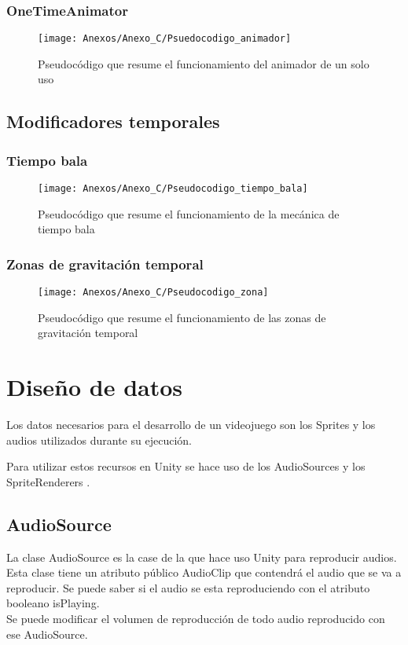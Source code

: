 \subsubsection{OneTimeAnimator}

\begin{figure}[h]
\centering
\texttt{[image: Anexos/Anexo\_C/Psuedocodigo\_animador]}
\caption{Pseudocódigo que resume el funcionamiento del animador de un solo uso}
\end{figure}

\subsection{Modificadores temporales}
\subsubsection{Tiempo bala}

\begin{figure}[h]
\centering
\texttt{[image: Anexos/Anexo\_C/Pseudocodigo\_tiempo\_bala]}
\caption{Pseudocódigo que resume el funcionamiento de la mecánica de tiempo bala}
\end{figure}

\clearpage
\subsubsection{Zonas de gravitación temporal}

\begin{figure}[h]
\centering
\texttt{[image: Anexos/Anexo\_C/Pseudocodigo\_zona]}
\caption{Pseudocódigo que resume el funcionamiento de las zonas de gravitación temporal}
\end{figure}

\section{Diseño de datos}
Los datos necesarios para el desarrollo de un videojuego son los Sprites y los audios utilizados durante su ejecución.

Para utilizar estos recursos en Unity se hace uso de los AudioSources \cite{AudioSource} y los SpriteRenderers \cite{SpriteRenderer}.

\subsection{AudioSource}
La clase AudioSource es la case de la que hace uso Unity para reproducir audios. Esta clase tiene un atributo público AudioClip que contendrá el audio que se va a reproducir. Se puede saber si el audio se esta reproduciendo con el atributo booleano isPlaying.\\
Se puede modificar el volumen de reproducción de todo audio reproducido con ese AudioSource.

